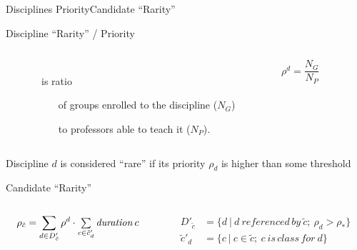 \documentclass{beamer}
\begin{document}
\begin{frame}{Disciplines Priority}{Candidate ``Rarity''}
  \begin{block}{Discipline ``Rarity'' / Priority}
    \begin{columns}
      \begin{column}{-.5cm}\end{column}
      \begin{column}{.65\textwidth}\\
        is ratio
        \begin{itemize}
          \item[of] groups enrolled to the discipline ($N_G$)
          \item[to] professors able to teach it ($N_P$).
        \end{itemize}
      \end{column}
      \begin{column}{.1\textwidth}
        $$\rho^d = \dfrac{N_G}{N_P}$$
      \end{column}
      \begin{column}{.1\textwidth}\end{column}
    \end{columns}
    \bigskip
    Discipline $d$ is considered \alert{``rare''} if its priority
    $\rho_d$ is higher than some threshold
  \end{block}
  \begin{block}{Candidate ``Rarity''}
    \begin{columns}
      \begin{column}{.4\textwidth}
        \bigskip
        $$\rho_{\tilde{c}} = \sum\limits_{d \in D'_{\tilde{c}}}
                \rho^d \cdot \mathsmaller{ \sum\limits_{c \in \tilde{c}'_d}
                                     \mathit{duration}\, c }$$
      \end{column}
      \begin{column}{.4\textwidth}
        \begin{align*}
          D'_{\tilde{c}} &= \lbrace d ~|~ d ~\mathit{referenced\,by}~ \tilde{c};~
                                        \rho_d > \rho_* \rbrace\\
          \tilde{c}'_d &= \lbrace c ~|~ c \in \tilde{c};~ c ~\mathit{is\,class\,for}~ d \rbrace
        \end{align*}
      \end{column}
    \end{columns}
  \end{block}
\end{frame}
\end{document}
